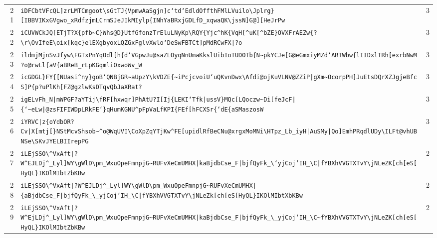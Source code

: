 \begin{xltabular}{\textwidth}{@{} r >{\raggedright\arraybackslash}X r @{}}
        21 & \texttt{iDFCbtVFcQL]zrLMTCmgoot\textbackslash{}sGtTJ\{VpmwAaSgjn]c`td`EdldOffthFMlLVuilo\textbackslash{}Jplrg\}[IBBVIKxGVgwo\_xRdfzjmLCrmSJeJIkMIylp\{INhYaBRxjGDLfD\_xqwaQK\textbackslash{}jssN]G@][HeJrPw} & 3 \\
        22 & \texttt{iCUVWCkJQ[ETjT?X\{pfb\textasciitilde{}C\}Whs@D\}UtfGfonzTrEluLNyKp\textbackslash{}RQY\{Yjc\textasciicircum{}hK\{VqH[\textasciicircum{}uK[\textasciicircum{}bZE\}OVXFrAEZw\{?\textbackslash{}r\textbackslash{}OvIfeE\textbackslash{}oix[kqc\}elEXgbyoxLQZGxFglvXwlo`DeSwFBTCt]pMdRCwFX|?o} & 3 \\
        23 & \texttt{ildmjMjnSvJfyw\textbackslash{}FGTxPnYqOdl[h\{d`VGpwJu@saZLOyqNnUmaKkslUibIoTUDOTb\{N\textasciitilde{}pkYCJe[G@eGmxiyMZd`ARTWbw\{lIIDxlTRh[exrbNwM?o@rwLl\{aV\{aBReB\_rLpKGqmliOxwoWv\_W} & 3 \\
        24 & \texttt{icGDGL\}FY\{[NUasi\textasciicircum{}ny\}goB`QNBjGR\textasciitilde{}aUpzY\textbackslash{}kVDZE\{\textasciitilde{}iPcjcvoiU`uQKvnDwx\textbackslash{}Afdi@ojKuVLNV@ZZiP|gXm\textasciitilde{}OcorpPH]JuEtsDQrXZJgjeBfcS]P\{p?uPlKh[FZ@gzlwKsDTqvQbJaXRat?} & 3 \\
        25 & \texttt{igELvFh\_N|mWPGF?aYTij\textbackslash{}fRF[hxwqr]PhAtU?I[Ij\{LEKI`Tfk|ussV\}MQc[LQoczw\textasciitilde{}Di[feJcF|\{`\textasciitilde{}eLw|@zsFIFIWDpLRkFE`\}qHumKGNU\textasciicircum{}pFpVaLfKPI\{FEf[hFCXSr\{`dE\{aSMaszosW} & 3 \\
        26 & \texttt{iYRVC|z\{oYdbOR?Cv|X[mtj[\}NStMcvShsob\textasciitilde{}\textasciicircum{}o@WqUVI\textbackslash{}CoXpZqYTjKw\textasciicircum{}FE[upidlRfBeCNu@xrgxMoMNi\textbackslash{}HTpz\_Lb\_iyH|AuSMy|Qo]EmhPRqdlUDy\textbackslash{}ILFt@vhUBNSe\textbackslash{}SKvJYELBIIrepPG} & 3 \\
        27 & \texttt{iLEjSSO\textbackslash{}\textasciicircum{}VxAft|?W\textasciicircum{}EJLDj\textasciicircum{}\_Lyl]WY\textbackslash{}gWlD\textbackslash{}pm\_WxuOpeFmnpjG\textasciitilde{}RUFvXeCmUMHX|kaBjdbCse\_F|bjfQyFk\_\textbackslash{}`yjCoj`IH\_\textbackslash{}C|fYBXhVVGTXTvY\textbackslash{}jNLeZK[ch[eS[HyQL\}IKOlMIbtZbKBw} & 2 \\
        28 & \texttt{iLEjSSO\textbackslash{}\textasciicircum{}VxAft|?W\textasciicircum{}EJLDj\textasciicircum{}\_Lyl]WY\textbackslash{}gWlD\textbackslash{}pm\_WxuOpeFmnpjG\textasciitilde{}RUFvXeCmUMHX|\{aBjdbCse\_F|bjfQyFk\_\textbackslash{}\_yjCoj`IH\_\textbackslash{}C|fYBXhVVGTXTvY\textbackslash{}jNLeZk[ch[eS[HyQL\}IKOlMIbtXbKBw} & 2 \\
        29 & \texttt{iLEjSSO\textbackslash{}\textasciicircum{}VxAft|?W\textasciicircum{}EjLDj\textasciicircum{}\_Lyl]WY\textbackslash{}gWlD\textbackslash{}pm\_WxuOpeFmnpjG\textasciitilde{}RUFvXeCmUMHX|kaBjdbCse\_F|bjfQyFk\_\textbackslash{}\_yjCoj`IH\_\textbackslash{}C\textasciitilde{}fYBXhVVGTXTvY\textbackslash{}jNLeZK[ch[eS[HyQL\}IKOlMIbtZbKBw} & 2 \\

\end{xltabular}
